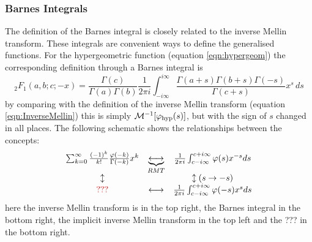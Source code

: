 \documentclass[journal=jcisd8,manuscript=article,layout=onecolumn,pdftex,floatfix,amsmath,amssymb,10pt]{achemso}
\begin{document}
\subsubsection{Barnes Integrals}
\label{sec:BarnesIntegral}
The definition of the Barnes integral is closely related to the inverse Mellin transform. These integrals are convenient ways to define the generalised functions. For the hypergeometric function (equation \ref{eqn:hypergeom}) the corresponding definition through a Barnes integral is
\begin{equation}
_2F_1(a,b;c;-x) =\frac{\Gamma(c)}{\Gamma(a)\Gamma(b)} \frac{1}{2\pi i} \int_{-i\infty}^{i\infty} \frac{\Gamma(a+s)\Gamma(b+s)\Gamma(-s)}{\Gamma(c+s)}x^s\,ds
\end{equation}
by comparing with the definition of the inverse Mellin transform (equation \ref{eqn:InverseMellin}) this is simply $\mathcal{M}^{-1}[\varphi_{\rm hyp}(s)]$, but with the sign of $s$ changed in all places. The following schematic shows the relationships between the concepts:
\begin{equation}
\begin{matrix}
\sum_{k=0}^\infty \frac{(-1)^k}{k!}\frac{\varphi(-k)}{\Gamma(-k)}x^k & \underbrace{\longleftrightarrow}_{RMT} & \frac{1}{2\pi i}\int_{c-i\infty}^{c+i\infty} \varphi(s) x^{-s} d s\\
\updownarrow & & \updownarrow{(s \to -s)} \\
{\color{red} ???}& \longleftrightarrow & \frac{1}{2\pi i}\int_{c-i\infty}^{c+i\infty} \varphi(-s) x^{s} d s
\end{matrix}
\end{equation}
here the inverse Mellin transform is in the top right, the Barnes integral in the bottom right, the implicit inverse Mellin transform in the top left and the {\color{red}???} in the bottom right.
\end{document}
